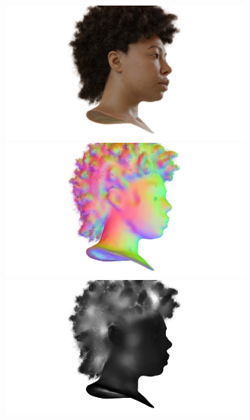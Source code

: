 \begin{figure}[tb]
  \centering
  \begin{subfigure}{0.155\linewidth}
  \includegraphics[width=\linewidth]{images/renders/khady_rgb_31.jpg}
  \includegraphics[width=\linewidth]{images/normals/khady_normals_31.jpg}
  \includegraphics[width=\linewidth]{images/frosting_size/khady_size_31.jpg}
  \end{subfigure}
  \hfill

\end{figure}
